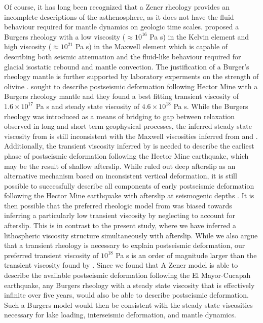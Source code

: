 \documentclass[12pt]{article}
\begin{document}
Of course, it has long been recognized that a Zener rheology provides an incomplete descriptions of the asthenosphere, as it does not have the fluid behaviour required for mantle dynamics on geologic time scales. \cite{Yuen1982} proposed a Burgers rheology with a low viscosity ($\approx 10^{16}$ Pa s) in the Kelvin element and high viscosity ($\approx 10^{21}$ Pa s) in the Maxwell element which is capable of describing both seismic attenuation and the fluid-like behaviour required for glacial isostatic rebound and mantle convection. The justification of a Burger's rheology mantle is further supported by laboratory experments on the strength of olivine \cite{Chopra1997}. \cite{Pollitz2003} sought to describe postseismic deformation following Hector Mine with a Burgers rheology mantle and they found a best fitting transient viscosity of $1.6\times10^{17}$ Pa s and steady state viscosity of $4.6\times10^{18}$ Pa s. While the Burgers rheology was introduced as a means of bridging to gap between relaxation observed in long and short term geophysical processes, the inferred steady state viscosity from \cite{Pollitz2003} is still inconsistent with the Maxwell viscosities inferred from \cite{Lundgren2009} and \cite{Luttrell2007}. Additionally, the transient viscosity inferred by \cite{Pollitz2003} is needed to describe the earliest phase of postseismic deformation following the Hector Mine earthquake, which may be the result of shallow afterslip. While \cite{Pollitz2003} ruled out deep afterslip as an alternative mechanism based on inconsistent vertical deformation, it is still possible to successfully describe all components of early postseismic deformation following the Hector Mine earthquake with afterslip at seismogenic depths \cite{Jacobs2002}. It is then possible that the preferred rheologic model from \cite{Pollitz2003} was biased towards inferring a particularly low transient viscosity by neglecting to account for afterslip.  This is in contrast to the present study, where we have inferred a lithospheric viscosity structure simultaneously with afterslip. While we also argue that a transient rheology is necessary to explain postseismic deformation, our preferred transient viscosity of $10^{18}$ Pa s is an order of magnitude larger than the transient viscosity found by \cite{Pollitz2003}.  Since we found that A Zener model is able to describe the available postseismic deformation following the El Mayor-Cucapah earthquake, any Burgers rheology with a steady state viscosity that is effectively infinite over five years, would also be able to describe postseismic deformation. Such a Burgers model would then be consistent with the steady state viscosities necessary for lake loading, interseismic deformation, and mantle dynamics.
\end{document}
